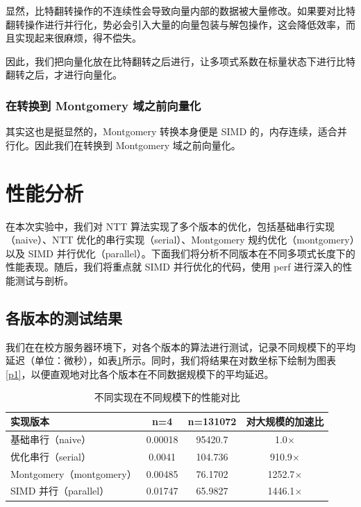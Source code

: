 \documentclass[a4paper]{article}
\begin{document}
显然，比特翻转操作的不连续性会导致向量内部的数据被大量修改。如果要对比特翻转操作进行并行化，势必会引入大量的向量包装与解包操作，这会降低效率，而且实现起来很麻烦，得不偿失。

因此，我们把向量化放在比特翻转之后进行，让多项式系数在标量状态下进行比特翻转之后，才进行向量化。

\subsubsection{在转换到 Montgomery 域之前向量化}

其实这也是挺显然的，Montgomery 转换本身便是 SIMD 的，内存连续，适合并行化。因此我们在转换到 Montgomery 域之前向量化。

\section{性能分析}

在本次实验中，我们对 NTT 算法实现了多个版本的优化，包括基础串行实现（naive）、NTT 优化的串行实现（serial）、Montgomery 规约优化（montgomery）以及 SIMD 并行优化（parallel）。下面我们将分析不同版本在不同多项式长度下的性能表现。随后，我们将重点就 SIMD 并行优化的代码，使用 perf 进行深入的性能测试与剖析。

\subsection{各版本的测试结果}

我们在在校方服务器环境下，对各个版本的算法进行测试，记录不同规模下的平均延迟（单位：微秒），如表\ref{t1}所示。同时，我们将结果在对数坐标下绘制为图表\ref{p1}，以便直观地对比各个版本在不同数据规模下的平均延迟。

\begin{table}[h]
\centering
\begin{tabular}{|l|c|c|c|}
\hline
实现版本 & n=4 & n=131072 & 对大规模的加速比 \\ \hline
基础串行（naive） & 0.00018 & 95420.7 & 1.0$\times$ \\ \hline
优化串行（serial） & 0.0041 & 104.736 & 910.9$\times$ \\ \hline
Montgomery（montgomery） & 0.00485 & 76.1702 & 1252.7$\times$ \\ \hline
SIMD 并行（parallel） & 0.01747 & 65.9827 & 1446.1$\times$ \\ \hline
\end{tabular}
\caption{不同实现在不同规模下的性能对比}
\label{t1}
\end{table}
\end{document}
